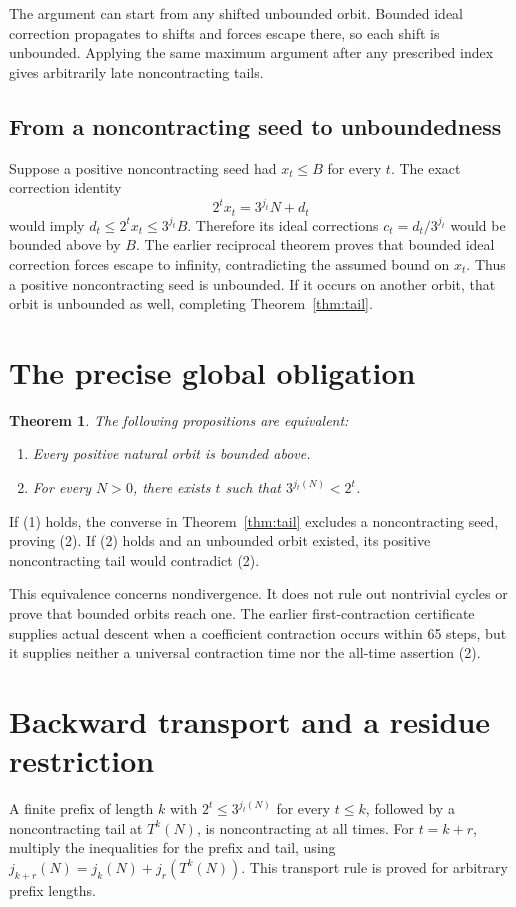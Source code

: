 \documentclass[10pt]{article}
\newtheorem{theorem}{Theorem}
\begin{document}
The argument can start from any shifted unbounded orbit. Bounded ideal
correction propagates to shifts and forces escape there, so each shift
is unbounded. Applying the same maximum argument after any prescribed
index gives arbitrarily late noncontracting tails.

\subsection*{From a noncontracting seed to unboundedness}
Suppose a positive noncontracting seed had $x_t\le B$ for every $t$.
The exact correction identity
\[
2^t x_t=3^{j_t}N+d_t
\]
would imply $d_t\le2^t x_t\le3^{j_t}B$. Therefore its ideal corrections
$c_t=d_t/3^{j_t}$ would be bounded above by $B$. The earlier reciprocal
theorem proves that bounded ideal correction forces escape to infinity,
contradicting the assumed bound on $x_t$. Thus a positive noncontracting
seed is unbounded. If it occurs on another orbit, that orbit is unbounded
as well, completing Theorem~\ref{thm:tail}.

\section{The precise global obligation}
\begin{theorem}
The following propositions are equivalent:
\begin{enumerate}
\item Every positive natural orbit is bounded above.
\item For every $N>0$, there exists $t$ such that $3^{j_t(N)}<2^t$.
\end{enumerate}
\end{theorem}
If (1) holds, the converse in Theorem~\ref{thm:tail} excludes a
noncontracting seed, proving (2). If (2) holds and an unbounded orbit
existed, its positive noncontracting tail would contradict (2).

This equivalence concerns nondivergence. It does not rule out nontrivial
cycles or prove that bounded orbits reach one. The earlier first-contraction
certificate supplies actual descent when a coefficient contraction occurs
within 65 steps, but it supplies neither a universal contraction time nor
the all-time assertion (2).

\section{Backward transport and a residue restriction}
A finite prefix of length $k$ with $2^t\le3^{j_t(N)}$ for every $t\le k$,
followed by a noncontracting tail at $T^k(N)$, is noncontracting at all
times. For $t=k+r$, multiply the inequalities for the prefix and tail,
using $j_{k+r}(N)=j_k(N)+j_r(T^k(N))$. This transport rule is proved
for arbitrary prefix lengths.
\end{document}
